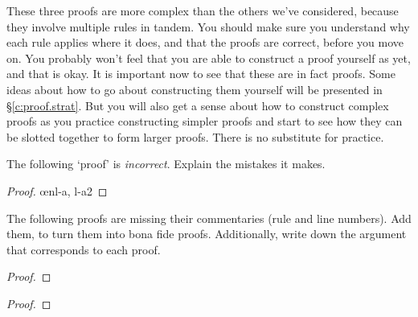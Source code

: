 These three proofs are more complex than the others we've considered, because they involve multiple rules in tandem. You should make sure you understand why each rule applies where it does, and that the proofs are correct, before you move on. You probably won't feel that you are able to construct a proof yourself as yet, and that is okay. It is important now to see that these are in fact proofs. Some ideas about how to go about constructing them yourself will be presented in §\ref{c:proof.strat}. But you will also get a sense about how to construct complex proofs as you practice constructing simpler proofs and start to see how they can be slotted together to form larger proofs. There is no substitute for practice.


\clearpage
\practiceproblems


\problempart
The following `proof' is \emph{incorrect}. Explain the mistakes it makes.

\begin{proof}
\open
\close
\open
	\open
	\close
\close
{}\oe{nl-a, l-a2}
\end{proof}


\problempart
The following proofs are missing their commentaries (rule and line numbers). Add them, to turn them into bona fide proofs. Additionally, write down the argument that corresponds to each proof.
\begin{multicols}{2}\noindent


\begin{proof}
\open
\close
{}%
\end{proof}

\begin{proof}
\open
{}
\open
\close
\open
	\open
	\close
\close
{}%
\end{proof}
\end{multicols}


